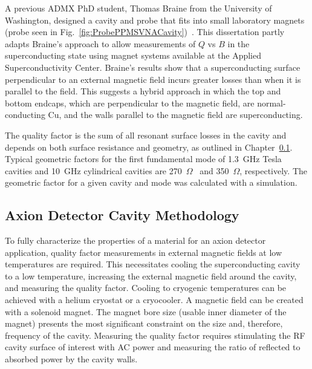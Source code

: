 
    A previous ADMX PhD student, Thomas Braine from the University of Washington, designed a cavity and probe that fits into small laboratory magnets (probe seen in Fig.~\ref{fig:ProbePPMSVNACavity})~\cite{Braine:2024nzi}. This dissertation partly adapts Braine's approach to allow measurements of $Q$ vs $B$ in the superconducting state using magnet systems available at the Applied Superconductivity Center. Braine's results show that a superconducting surface perpendicular to an external magnetic field incurs greater losses than when it is parallel to the field. This suggests a hybrid approach in which the top and bottom endcaps, which are perpendicular to the magnetic field, are normal-conducting Cu, and the walls parallel to the magnetic field are superconducting.

    The quality factor is the sum of all resonant surface losses in the cavity and depends on both surface resistance and geometry, as outlined in Chapter~\ref{sec:RFCharacterization}. Typical geometric factors for the first fundamental mode of 1.3~GHz Tesla cavities and 10~GHz cylindrical cavities are 270~$\Omega$~\cite{padamseeRFSuperconductivity2009} and 350~$\Omega$, respectively. The geometric factor for a given cavity and mode was calculated with a simulation. 

    
    \subsection{Axion Detector Cavity Methodology} \label{sec:RFCharacterization}


    To fully characterize the properties of a material for an axion detector application, quality factor measurements in external magnetic fields at low temperatures are required. This necessitates cooling the superconducting cavity to a low temperature, increasing the external magnetic field around the cavity, and measuring the quality factor. Cooling to cryogenic temperatures can be achieved with a helium cryostat or a cryocooler. A magnetic field can be created with a solenoid magnet. The magnet bore size (usable inner diameter of the magnet) presents the most significant constraint on the size and, therefore, frequency of the cavity. Measuring the quality factor requires stimulating the RF cavity surface of interest with AC power and measuring the ratio of reflected to absorbed power by the cavity walls. 
    
